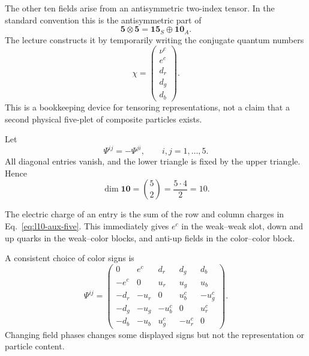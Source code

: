 The other ten fields arise from an antisymmetric two-index tensor. In the standard convention this is the antisymmetric part of
\begin{equation}
\mathbf5\otimes\mathbf5
=\mathbf{15}_S\oplus\mathbf{10}_A.
\label{eq:l10-five-five}
\end{equation}
The lecture constructs it by temporarily writing the conjugate quantum numbers
\begin{equation}
\chi=
\begin{pmatrix}
\nu^c\\
e^c\\
d_r\\
d_g\\
d_b
\end{pmatrix}.
\label{eq:l10-aux-five}
\end{equation}
This is a bookkeeping device for tensoring representations, not a claim that a second physical five-plet of composite particles exists.

Let
\begin{equation}
\Psi^{ij}=-\Psi^{ji},
\qquad
i,j=1,\ldots,5.
\label{eq:l10-antisym-ten}
\end{equation}
All diagonal entries vanish, and the lower triangle is fixed by the upper triangle. Hence
\begin{equation}
\dim\mathbf{10}
=\binom52
=\frac{5\cdot4}{2}
=10.
\label{eq:l10-ten-count}
\end{equation}

The electric charge of an entry is the sum of the row and column charges in Eq.~\eqref{eq:l10-aux-five}. This immediately gives \(e^c\) in the weak--weak slot, down and up quarks in the weak--color blocks, and anti-up fields in the color--color block.

\begin{classroomqa}
\end{classroomqa}

A consistent choice of color signs is
\begin{equation}
\Psi^{ij}=
\begin{pmatrix}
0 & e^c & d_r & d_g & d_b\\
-e^c & 0 & u_r & u_g & u_b\\
-d_r & -u_r & 0 & u_b^c & -u_g^c\\
-d_g & -u_g & -u_b^c & 0 & u_r^c\\
-d_b & -u_b & u_g^c & -u_r^c & 0
\end{pmatrix}.
\label{eq:l10-ten-matrix}
\end{equation}
Changing field phases changes some displayed signs but not the representation or particle content.

